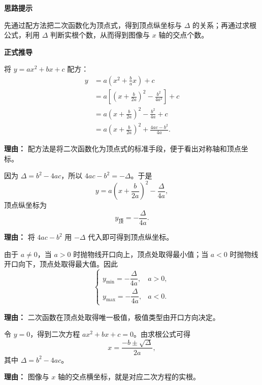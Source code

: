 \begin{proofbox}
	\textbf{\textcolor{CProof}{思路提示}}

	先通过配方法把二次函数化为顶点式，得到顶点纵坐标与 $\Delta$ 的关系；再通过求根公式，利用 $\Delta$ 判断实根个数，从而得到图像与 $x$ 轴的交点个数。

	\medskip
	\textbf{\textcolor{CProof}{正式推导}}
	\begin{description}[style=nextline, leftmargin=2.8em, labelsep=0.5em, itemsep=0.55em]
		\item[\textbf{步骤一（配方变形）：}]
		      将 $y=ax^2+bx+c$ 配方：
		      \[
			      \begin{aligned}
				      y
				       & =a\left(x^2+\frac{b}{a}x\right)+c                               \\
				       & =a\left[\left(x+\frac{b}{2a}\right)^2-\frac{b^2}{4a^2}\right]+c \\
				       & =a\left(x+\frac{b}{2a}\right)^2-\frac{b^2}{4a}+c                \\
				       & =a\left(x+\frac{b}{2a}\right)^2+\frac{4ac-b^2}{4a}.
			      \end{aligned}
		      \]
		      \par\textbf{理由：} 配方法是将二次函数化为顶点式的标准手段，便于看出对称轴和顶点坐标。

		\item[\textbf{步骤二（引入判别式）：}]
		      因为 $\Delta=b^2-4ac$，所以 $4ac-b^2=-\Delta$。于是
		      \[
			      y=a\left(x+\frac{b}{2a}\right)^2-\frac{\Delta}{4a},
		      \]
		      顶点纵坐标为
		      \[
			      y_{\text{顶}}=-\frac{\Delta}{4a}.
		      \]
		      \par\textbf{理由：} 将 $4ac-b^2$ 用 $-\Delta$ 代入即可得到顶点纵坐标。

		\item[\textbf{步骤三（判断最值）：}]
		      由于 $a\neq0$，当 $a>0$ 时抛物线开口向上，顶点处取得最小值；当 $a<0$ 时抛物线开口向下，顶点处取得最大值。因此
		      \[
			      \begin{cases}
				      y_{\min}=-\dfrac{\Delta}{4a}, & a>0, \\[4pt]
				      y_{\max}=-\dfrac{\Delta}{4a}, & a<0.
			      \end{cases}
		      \]
		      \par\textbf{理由：} 二次函数在顶点处取得唯一极值，极值类型由开口方向决定。

		\item[\textbf{步骤四（解对应方程）：}]
		      令 $y=0$，得到二次方程 $ax^2+bx+c=0$。由求根公式可得
		      \[
			      x=\frac{-b\pm\sqrt{\Delta}}{2a},
		      \]
		      其中 $\Delta=b^2-4ac$。
		      \par\textbf{理由：} 图像与 $x$ 轴的交点横坐标，就是对应二次方程的实根。


\end{description}
\end{proofbox}
